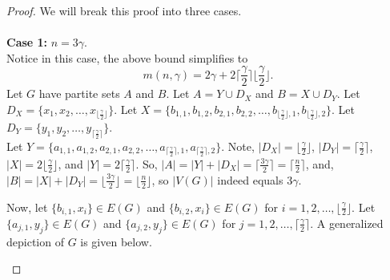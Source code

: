 \documentclass[12pt]{amsart}
\newcommand{\floor}[1]{\lfloor{#1}\rfloor}
\newcommand{\ceil}[1]{\lceil{#1}\rceil}
\begin{document}
\begin{proof}
    We will break this proof into three cases.\\\\
    \textbf{Case 1:} $n = 3\gamma$.\\
    Notice in this case, the above bound simplifies to $$m(n,\gamma) = 2 \gamma + 2 \lceil \frac{\gamma}{2} \rceil \lfloor \frac{\gamma}{2} \rfloor.$$
    Let $G$ have partite sets $A$ and $B$. Let $A = Y \cup D_X$ and $B = X \cup D_Y$. Let $D_X = \{x_1, x_2, \ldots, x_{\lfloor \frac{\gamma}{2}\rfloor}\}$. Let $X = \{b_{1,1},b_{1,2}, b_{2,1},b_{2,2}, \ldots,b_{\lfloor \frac{\gamma}{2}\rfloor,1},b_{\lfloor \frac{\gamma}{2}\rfloor,2}\}$. Let $D_Y = \{y_1,y_2,\ldots,y_{\ceil{\frac{\gamma}{2}}}\}$. \\Let $Y = \{a_{1,1},a_{1,2}, a_{2,1},a_{2,2}, \ldots,a_{\lceil \frac{\gamma}{2}\rceil,1},a_{\lceil \frac{\gamma}{2}\rceil,2}\}$. Note, $|D_X| = \lfloor \frac{\gamma}{2}\rfloor$, $|D_Y| = \lceil \frac{\gamma}{2}\rceil$, $|X| = 2\lfloor \frac{\gamma}{2}\rfloor$, and $|Y| = 2\lceil \frac{\gamma}{2}\rceil$. So, $|A| = |Y| + |D_X| = \lceil\frac{3\gamma}{2}\rceil = \lceil\frac{n}{2}\rceil$, and, $|B| = |X| + |D_Y| = \lfloor\frac{3\gamma}{2}\rfloor = \lfloor\frac{n}{2}\rfloor$, so $|V(G)|$ indeed equals $3\gamma$.

    Now, let $\{b_{i,1},x_i\}\in E(G)$ and $\{b_{i,2},x_i\}\in E(G)$ for $i = 1,2,\ldots, \floor{\frac{\gamma}{2}}$.  Let $\{a_{j,1},y_j\}\in E(G)$ and $\{a_{j,2},y_j\}\in E(G)$ for $j = 1,2,\ldots, \ceil{\frac{\gamma}{2}}$.
    A generalized depiction of $G$ is given below.
    

\begin{figure}[H]
\centering
\end{figure}
\end{proof}
\end{document}
